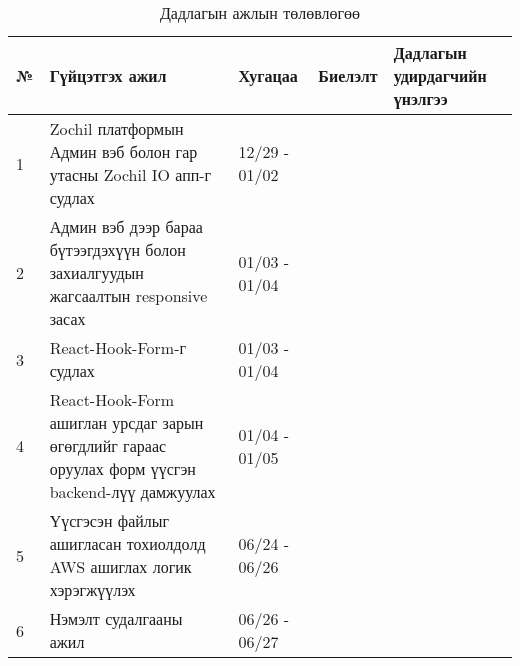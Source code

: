 \begin{table}[h]
	\caption{Дадлагын ажлын төлөвлөгөө}
	\begin{tabular}{|p{0.5cm}|p{8cm}|l|l|p{3cm}|}
	\hline
	\textbf{№} & \textbf{Гүйцэтгэх ажил} & \textbf{Хугацаа} & \textbf{Биелэлт} & \textbf{Дадлагын удирдагчийн үнэлгээ} \\ \hline
	1 & Zochil платформын Админ вэб болон гар утасны Zochil IO апп-г судлах & 12/29 - 01/02 && \\ \hline
	2 & Админ вэб дээр бараа бүтээгдэхүүн болон захиалгуудын жагсаалтын responsive засах & 01/03 - 01/04 && \\ \hline
	3 & React-Hook-Form-г судлах & 01/03 - 01/04 && \\ \hline
	4 & React-Hook-Form ашиглан урсдаг зарын өгөгдлийг гараас оруулах форм үүсгэн backend-лүү дамжуулах  & 01/04 - 01/05 && \\ \hline
	5 & Үүсгэсэн файлыг ашигласан тохиолдолд AWS ашиглах логик хэрэгжүүлэх & 06/24 - 06/26 && \\ \hline
	6 & Нэмэлт судалгааны ажил & 06/26 - 06/27 && \\ \hline

	\end{tabular}
	\end{table}